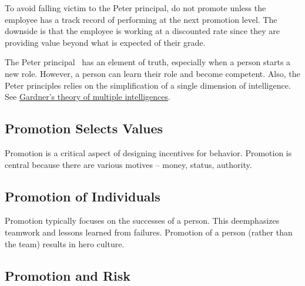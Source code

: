 To avoid falling victim to the Peter principal, do not promote unless the employee has a track record of performing at the next promotion level. The downside is that the employee is working at a discounted rate since they are providing value beyond what is expected of their grade.


The Peter principal~\cite{1970_Peter} has an element of truth, especially when a person starts a new role. However, a person can learn their role and become competent. Also, the Peter principles relies on the simplification of a single dimension of intelligence. 
See \href{https://en.wikipedia.org/wiki/Theory_of_multiple_intelligences}{Gardner's theory of multiple intelligences}.


\subsection*{Promotion Selects Values}
Promotion is a critical aspect of designing incentives for behavior. Promotion is central because there are various motives --  money,  status,  authority. 


\subsection*{Promotion of Individuals}

Promotion typically focuses on the successes of a person. This deemphasizes teamwork and lessons learned from failures. 
Promotion of a person (rather than the team) results in hero culture.

\subsection*{Promotion and Risk}



